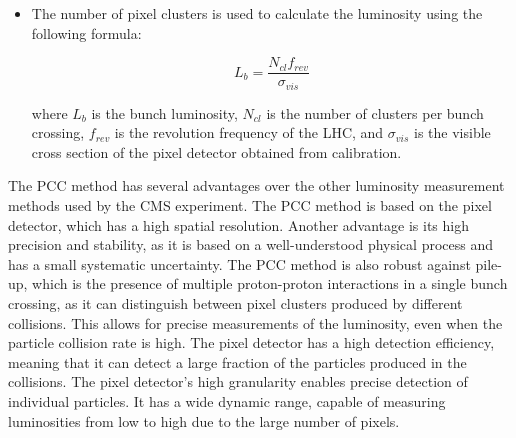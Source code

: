 \begin{itemize}
\item The number of pixel clusters is used to calculate the luminosity using the following formula:

\begin{equation}
 L_b = \frac{N_{cl} f_{rev} } {\sigma_{vis}}   
\end{equation}

where $L_b$ is the bunch luminosity, $N_{cl}$ is the number of clusters per bunch crossing, $f_{rev}$ is the revolution frequency of the LHC, and $\sigma_{vis}$ is the visible cross section of the pixel detector obtained from calibration.

\end{itemize}

The PCC method has several advantages over the other luminosity measurement methods used by the CMS experiment. The PCC method is based on the pixel detector, which has a high spatial resolution. Another advantage is its high precision and stability, as it is based on a well-understood physical process and has a small systematic uncertainty. %
The PCC method is also robust against pile-up, which is the presence of multiple proton-proton interactions in a single bunch crossing, as it can distinguish between pixel clusters produced by different collisions. %
This allows for precise measurements of the luminosity, even when the particle collision rate is high. The pixel detector has a high detection efficiency, meaning that it can detect a large fraction of the particles produced in the collisions. The pixel detector's high granularity enables precise detection of individual particles. %
It has a wide dynamic range, capable of measuring luminosities from low to high due to the large number of pixels.


